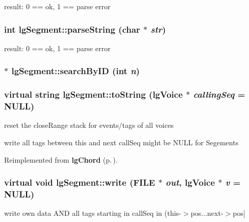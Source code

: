 result: 0 == ok, 1 == parse error 

\subsubsection{\setlength{\rightskip}{0pt plus 5cm}int lg\-Segment::parse\-String (char $\ast$ {\em str})}\label{classlgSegment_a3}


result: 0 == ok, 1 == parse error 

\subsubsection{$\ast$ lg\-Segment::search\-By\-ID (int {\em n})\hspace{0.3cm}{\tt  [inline]}}\label{classlgSegment_a24}


\subsubsection{\setlength{\rightskip}{0pt plus 5cm}virtual string lg\-Segment::to\-String ({\bf lg\-Voice} $\ast$ {\em calling\-Seq} = NULL)\hspace{0.3cm}{\tt  [inline, virtual]}}\label{classlgSegment_a21}


reset the close\-Range stack for events/tags of all voices 

write all tags between this and next call\-Seq might be NULL for Segements 

Reimplemented from {\bf lg\-Chord} {\rm (p.\,\pageref{classlgChord_a6})}.
\subsubsection{\setlength{\rightskip}{0pt plus 5cm}virtual void lg\-Segment::write (FILE $\ast$ {\em out}, {\bf lg\-Voice} $\ast$ {\em v} = NULL)\hspace{0.3cm}{\tt  [inline, virtual]}}\label{classlgSegment_a22}


write own data AND all tags starting in call\-Seq in (this-$>$pos...next-$>$pos] 




